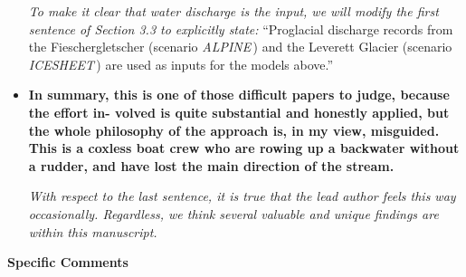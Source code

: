 \documentclass[11pt]{article}
\newcommand{\alpine}{\textit{ALPINE}\,}
\newcommand{\icesheet}{\textit{ICESHEET}\,}
\begin{document}
\begin{itemize}
  \textit{To make it clear that water discharge is the input, we will modify the first sentence of Section 3.3 to explicitly state:}
    ``Proglacial discharge records from the Fieschergletscher (scenario \alpine{}) and the Leverett Glacier (scenario \icesheet{}) are used as inputs for the models above.''

\item \textbf{  In summary, this is one of those difficult papers to judge, because the effort in- volved is quite substantial and honestly applied, but the whole philosophy of the approach is, in my view, misguided. This is a coxless boat crew who are rowing up a backwater without a rudder, and have lost the main direction of the stream.}

  \textit{With respect to the last sentence, it is true that the lead author feels this way occasionally. Regardless, we think several valuable and unique findings are within this manuscript.}

\end{itemize}

\textbf{Specific Comments}
\end{document}
